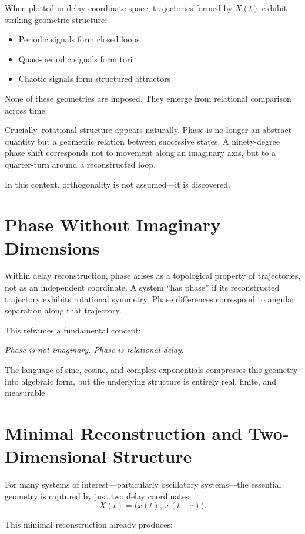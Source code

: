 \documentclass[12pt]{book}  %
\begin{document}
When plotted in delay-coordinate space, trajectories formed by \( X(t) \) exhibit striking geometric structure:

\begin{itemize}
    \item Periodic signals form closed loops
    \item Quasi-periodic signals form tori
    \item Chaotic signals form structured attractors
\end{itemize}

None of these geometries are imposed. They emerge from relational comparison across time.

Crucially, rotational structure appears naturally. Phase is no longer an abstract quantity but a geometric relation between successive states. A ninety-degree phase shift corresponds not to movement along an imaginary axis, but to a quarter-turn around a reconstructed loop.

In this context, orthogonality is not assumed—it is discovered.

\section*{Phase Without Imaginary Dimensions}

Within delay reconstruction, phase arises as a topological property of trajectories, not as an independent coordinate. A system “has phase” if its reconstructed trajectory exhibits rotational symmetry. Phase differences correspond to angular separation along that trajectory.

This reframes a fundamental concept:

\textit{Phase is not imaginary. Phase is relational delay.}

The language of sine, cosine, and complex exponentials compresses this geometry into algebraic form, but the underlying structure is entirely real, finite, and measurable.

\section*{Minimal Reconstruction and Two-Dimensional Structure}

For many systems of interest—particularly oscillatory systems—the essential geometry is captured by just two delay coordinates:
\[
X(t) = \bigl( x(t),\ x(t - \tau) \bigr).
\]

This minimal reconstruction already produces:
\end{document}
